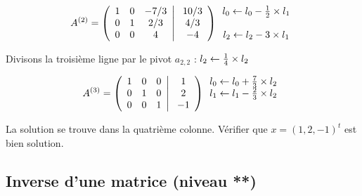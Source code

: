 \documentclass[a4paper, 10pt]{article}
\begin{document}
\begin{equation}
A^{(2)}=
\left(
\begin{array}{c c c c }
1  & 0   & -7/3  \\
0  & 1   & 2/3   \\
0  & 0  &  4  \\ 
\end{array}
\right|
\left.
\begin{array}{c}
{10/3}   \\ {4/3}    \\ -4  \\ 
\end{array}
\right)
\begin{array}{c}
l_0 \leftarrow  l_0 -{1 \over 2}  \times l_1   \\     \\ l_2 \leftarrow  l_2 -3 \times l_1  \\ 
\end{array}
\end{equation}

Divisons la troisième ligne par le pivot $a_{2,2}$ : $l_2 \leftarrow {1 \over 4} \times l_2$

\begin{equation}
A^{(3)}=
\left(
\begin{array}{c c c c }
1  & 0   & 0  \\
0  & 1   & 0   \\
0  & 0  &  1  \\ 
\end{array}
\right|
\left.
\begin{array}{c}
1   \\ 2    \\ -1  \\ 
\end{array}
\right)
\begin{array}{c}
l_0 \leftarrow  l_0 +{7 \over 3}  \times l_2   \\   l_1 \leftarrow  l_1 - {2 \over 3} \times l_2   \\  \\ 
\end{array}
\end{equation}

La solution se trouve dans la quatrième colonne. Vérifier que $x=\left(1, 2, -1 \right)^t$ est bien solution.

\subsection{Inverse d'une matrice (niveau **)}
\end{document}
